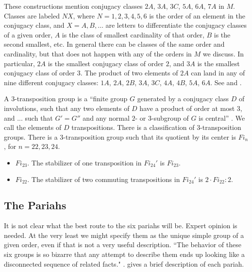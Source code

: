 These constructions mention conjugacy classes $2A$, $3A$, $3C$, $5A$,
$6A$, $7A$ in $M$. Classes are labeled $NX$, where $N=1,2,3,4,5,6$ is
the order of an element in the conjugacy class, and $X=A,B,\ldots$ are
letters to differentiate the conjugacy classes of a given order, $A$
is the class of smallest cardinality of that order, $B$ is the second
smallest, etc.  In general there can be classes of the same order and
cardinality, but that does not happen with any of the orders in $M$ we
discuss.  In particular, $2A$ is the smallest conjugacy class of order
$2$, and $3A$ is the smallest conjugacy class of order $3$.  The
product of two elements of $2A$ can land in any of nine different
conjugacy classes: $1A$, $2A$, $2B$, $3A$, $3C$, $4A$, $4B$, $5A$,
$6A$.  See \cite[p.7]{Ga} and \cite[p256]{wilson2009finite}.

A $3$-transposition group is a ``finite group $G$ generated by a
conjugacy class $D$ of involutions, such that any two elements of $D$
have a product of order at most $3$, and ... such that $G' = G''$ and
any normal $2$- or $3$-subgroup of $G$ is central''
\cite[p235]{wilson2009finite}.  We call the elements of $D$
transpositions.  There is a classification of $3$-transposition
groups.  There is a $3$-transposition group such that its quotient by
its center is $Fi_n$, for $n=22,23,24$.

\begin{itemize}
\item $Fi_{23}$.
  The stabilizer of one transposition in $Fi_{24}'$ is $Fi_{23}$.
\item $Fi_{22}$.  The stabilizer of two commuting transpositions in
  $Fi_{24}'$ is $2\cdot Fi_{22}:2$. \cite[p.250]{wilson2009finite}
\end{itemize}

\subsection{The Pariahs} \label{pariahs}

It is not clear what the best route to the six pariahs will be.
Expert opinion is needed.  At the very least we might specify them as
the unique simple group of a given order, even if that is not a very
useful description.  ``The behavior of these six groups is so bizarre
that any attempt to describe them ends up looking like a disconnected
sequence of related facts." \cite[p.184]{wilson2009finite}.
\cite[pp.150-153]{robert1998twelve} gives a brief description of each
pariah.

